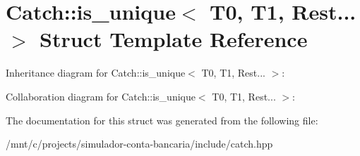 \hypertarget{structCatch_1_1is__unique_3_01T0_00_01T1_00_01Rest_8_8_8_01_4}{}\section{Catch\+:\+:is\+\_\+unique$<$ T0, T1, Rest... $>$ Struct Template Reference}
\label{structCatch_1_1is__unique_3_01T0_00_01T1_00_01Rest_8_8_8_01_4}


Inheritance diagram for Catch\+:\+:is\+\_\+unique$<$ T0, T1, Rest... $>$\+:


Collaboration diagram for Catch\+:\+:is\+\_\+unique$<$ T0, T1, Rest... $>$\+:


The documentation for this struct was generated from the following file\+:\begin{DoxyCompactItemize}
\item 
/mnt/c/projects/simulador-\/conta-\/bancaria/include/catch.\+hpp\end{DoxyCompactItemize}
